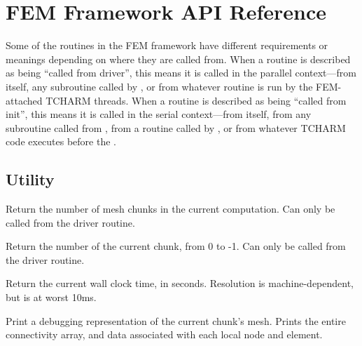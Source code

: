 \documentclass[10pt]{article}
\begin{document}
\section{FEM Framework API Reference}

Some of the routines in the FEM framework have different requirements or meanings
depending on where they are called from.  When a routine is described
as being ``called from driver'', this means it is called in the parallel
context---from  itself, any subroutine called by ,
or from whatever routine is run by the FEM-attached TCHARM threads.
When a routine is described as being ``called from init'', this means it is 
called in the serial context---from  itself, from any subroutine
called from , from a routine called by ,
or from whatever TCHARM code executes before the .


\subsection{Utility}


     Return the number of mesh chunks in the current computation.  Can
     only be called from the driver routine.


     Return the number of the current chunk, from 0 to
     -1.  Can only be called from the driver routine.


     Return the current wall clock time, in seconds.  Resolution is
     machine-dependent, but is at worst 10ms.


     Print a debugging representation of the current chunk's mesh.
     Prints the entire connectivity array, and data associated with
     each local node and element.

\end{document}
